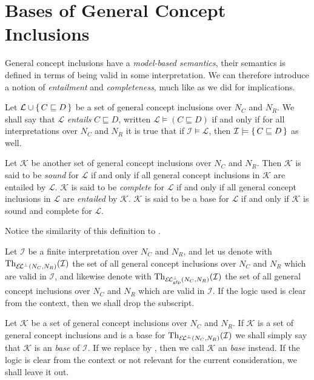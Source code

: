 \section{Bases of General Concept Inclusions}
\label{sec:bases-gener-conc}

General concept inclusions have a \emph{model-based semantics}, their semantics is defined
in terms of being valid in some interpretation.  We can therefore introduce a notion of
\emph{entailment} and \emph{completeness}, much like as we did for implications.

\begin{Definition}
  \label{def:entailment-of-gcis}
  Let $\mathcal{L} \cup {\ensuremath{\{\, C \sqsubseteq D \,\}}}$ be a set of general concept inclusions
  over $N_C$ and $N_R$.  We shall say that $\mathcal{L}$ \emph{entails} $C \sqsubseteq D$,
  written $\mathcal{L} \models (C \sqsubseteq D)$ if and only if for all interpretations
  over $N_C$ and $N_R$ it is true that if $\mathcal{I} \models \mathcal{L}$, then
  $\mathcal{I} \models {\ensuremath{\{\, C \sqsubseteq D \,\}}}$ as well.

  Let $\mathcal{K}$ be another set of general concept inclusions over $N_C$ and $N_R$.
  Then $\mathcal{K}$ is said to be \emph{sound} for $\mathcal{L}$ if and only if all
  general concept inclusions in $\mathcal{K}$ are entailed by $\mathcal{L}$.
  $\mathcal{K}$ is said to be \emph{complete} for $\mathcal{L}$ if and only if all general
  concept inclusions in $\mathcal{L}$ are \emph{entailed} by $\mathcal{K}$.  $\mathcal{K}$
  is said to be a base for $\mathcal{L}$ if and only if $\mathcal{K}$ is sound and
  complete for $\mathcal{L}$.
\end{Definition}

Notice the similarity of this definition to .

Let $\mathcal{I}$ be a finite interpretation over $N_C$ and $N_R$, and let us denote with
$\operatorname{Th}_{{{\mathcal{E}\kern-.3ex\mathcal{L}}^\bot}(N_C, N_R)}(\mathcal{I})$ the set of all \ELbot general concept inclusions
over $N_C$ and $N_R$ which are valid in $\mathcal{I}$, and likewise denote with
$\operatorname{Th}_{{{\mathcal{E}\kern-.3ex\mathcal{L}}_\text{gfp}^\bot}(N_C, N_R)}(\mathcal{I})$ the set of all \ELgfpbot general concept
inclusions over $N_C$ and $N_R$ which are valid in $\mathcal{I}$.  If the logic used is
clear from the context, then we shall drop the subscript.

Let $\mathcal{K}$ be a set of general concept inclusions over $N_C$ and $N_R$.  If
$\mathcal{K}$ is a set of \ELbot general concept inclusions and is a base for
$\operatorname{Th}_{{{\mathcal{E}\kern-.3ex\mathcal{L}}^\bot}(N_C, N_R)}(\mathcal{I})$ we shall simply say that $\mathcal{K}$ is an
\emph{\ELbot base} of $\mathcal{I}$.  If we replace \ELbot by \ELgfpbot, then we call
$\mathcal{K}$ an \emph{\ELgfpbot base} instead.  If the logic is clear from the context or
not relevant for the current consideration, we shall leave it out.

